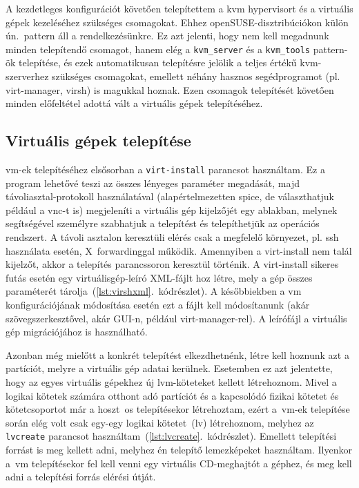 A kezdetleges konfigurációt követően telepítettem a \acrshort{kvm} \gls{hypervisor}t és a virtuális gépek kezeléséhez szükséges csomagokat. Ehhez openSUSE-disztribúciókon külön ún.~pattern áll a rendelkezésünkre. Ez azt jelenti, hogy nem kell megadnunk minden telepítendő csomagot, hanem elég a \texttt{kvm\_server} és a \texttt{kvm\_tools} pattern-ök telepítése, és ezek automatikusan telepítésre jelölik a teljes értékű \acrshort{kvm}-szerverhez szükséges csomagokat, emellett néhány hasznos segédprogramot (pl. virt-manager, virsh) is magukkal hoznak. Ezen csomagok telepítését követően minden előfeltétel adottá vált a virtuális gépek telepítéséhez.


\subsection{Virtuális gépek telepítése}
\acrshort{vm}-ek telepítéséhez elsősorban a \texttt{virt-install} parancsot használtam. Ez a program lehetővé teszi az összes lényeges paraméter megadását, majd távoliasztal-protokoll használatával (alapértelmezetten \acrshort{spice}, de választhatjuk például a \acrshort{vnc}-t is) megjeleníti a virtuális gép kijelzőjét egy ablakban, melynek segítségével személyre szabhatjuk a telepítést és telepíthetjük az operációs rendszert. A távoli asztalon keresztüli elérés csak a megfelelő környezet, pl. \acrshort{ssh} használata esetén, X~forwardinggal működik. Amennyiben a virt-install nem talál kijelzőt, akkor a telepítés parancssoron keresztül történik. A virt-install sikeres futás esetén egy virtuálisgép-leíró XML-fájlt hoz létre, mely a gép összes paraméterét tárolja~(\ref{lst:virshxml}.~kódrészlet). A későbbiekben a \acrshort{vm} konfigurációjának módosítása esetén ezt a fájlt kell módosítanunk (akár szövegszerkesztővel, akár GUI-n, például virt-manager-rel). A leírófájl a virtuális gép migrációjához is használható.

\vspace{2mm}


Azonban még mielőtt a konkrét telepítést elkezdhetnénk, létre kell hoznunk azt a partíciót, melyre a virtuális gép adatai kerülnek. Esetemben ez azt jelentette, hogy az egyes virtuális gépekhez új \acrshort{lvm}-köteteket kellett létrehoznom. Mivel a logikai kötetek számára otthont adó partíciót és a kapcsolódó fizikai kötetet és kötetcsoportot már a hoszt~\acrshort{os} telepítésekor létrehoztam, ezért a~\acrshort{vm}-ek telepítése során elég volt csak egy-egy logikai kötetet~(\acrshort{lv}) létrehoznom, melyhez az \texttt{lvcreate} parancsot használtam~(\ref{lst:lvcreate}.~kódrészlet).
Emellett telepítési forrást is meg kellett adni, melyhez én telepítő lemezképeket használtam. Ilyenkor a~\acrshort{vm} telepítésekor fel kell venni egy virtuális CD-meghajtót a géphez, és meg kell adni a telepítési forrás elérési útját.

